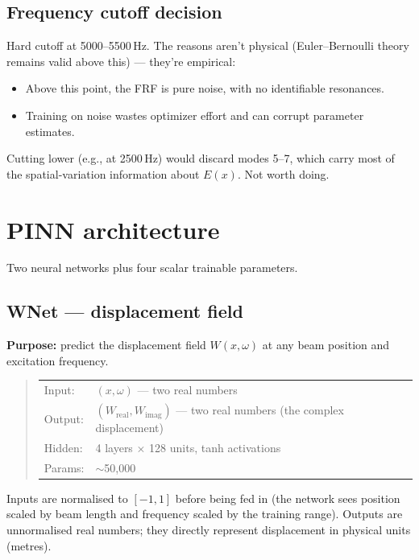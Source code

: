 \documentclass[11pt,a4paper]{article}
\begin{document}
\subsection{Frequency cutoff decision}

Hard cutoff at 5000--5500\,Hz. The reasons aren't physical (Euler--Bernoulli theory remains valid above this) --- they're empirical:
\begin{itemize}[leftmargin=*, itemsep=2pt]
\item Above this point, the FRF is pure noise, with no identifiable resonances.
\item Training on noise wastes optimizer effort and can corrupt parameter estimates.
\end{itemize}
Cutting lower (e.g., at 2500\,Hz) would discard modes 5--7, which carry most of the spatial-variation information about $E(x)$. Not worth doing.

\section{PINN architecture}
\label{sec:arch}

Two neural networks plus four scalar trainable parameters.

\subsection{WNet --- displacement field}

\textbf{Purpose:} predict the displacement field $W(x, \omega)$ at any beam position and excitation frequency.

\begin{quote}
\small
\begin{tabular}{ll}
Input:  & $(x, \omega)$ --- two real numbers \\
Output: & $(W_\text{real}, W_\text{imag})$ --- two real numbers (the complex displacement) \\
Hidden: & 4 layers $\times$ 128 units, tanh activations \\
Params: & $\sim$50{,}000 \\
\end{tabular}
\end{quote}

Inputs are normalised to $[-1, 1]$ before being fed in (the network sees position scaled by beam length and frequency scaled by the training range). Outputs are unnormalised real numbers; they directly represent displacement in physical units (metres).
\end{document}
